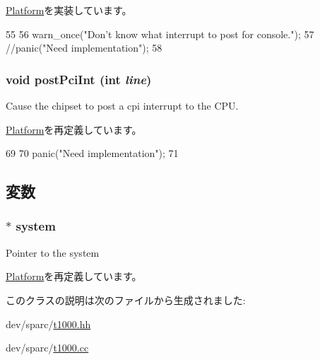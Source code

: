 \hyperlink{classPlatform_a24ab6780a0fa391b19980027355ba467}{Platform}を実装しています。


\begin{DoxyCode}
55 {
56     warn_once("Don't know what interrupt to post for console.\n");
57     //panic("Need implementation\n");
58 }
\end{DoxyCode}
\hypertarget{classT1000_a545d1445357706d7259aa73104f44222}{
\subsubsection[{postPciInt}]{\setlength{\rightskip}{0pt plus 5cm}void postPciInt (int {\em line})}}
\label{classT1000_a545d1445357706d7259aa73104f44222}
Cause the chipset to post a cpi interrupt to the CPU. 

\hyperlink{classPlatform_a545d1445357706d7259aa73104f44222}{Platform}を再定義しています。


\begin{DoxyCode}
69 {
70     panic("Need implementation\n");
71 }
\end{DoxyCode}


\subsection{変数}
\hypertarget{classT1000_af27ccd765f13a4b7bd119dc7579e2746}{
\subsubsection[{system}]{$\ast$ {\bf system}}}
\label{classT1000_af27ccd765f13a4b7bd119dc7579e2746}
Pointer to the system 

\hyperlink{classPlatform_af27ccd765f13a4b7bd119dc7579e2746}{Platform}を再定義しています。

このクラスの説明は次のファイルから生成されました:\begin{DoxyCompactItemize}
\item 
dev/sparc/\hyperlink{t1000_8hh}{t1000.hh}\item 
dev/sparc/\hyperlink{t1000_8cc}{t1000.cc}\end{DoxyCompactItemize}
